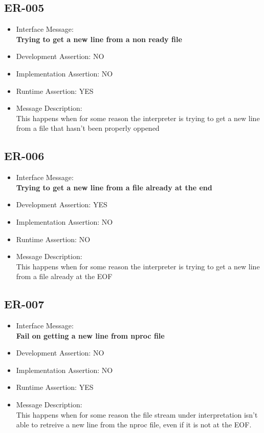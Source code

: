 \subsection{ER-005}
\begin{itemize}
  \item Interface Message:\\[1em]\textbf{Trying to get a new line from a non ready file}
  \item Development Assertion: NO
  \item Implementation Assertion: NO
  \item Runtime Assertion: YES
  \item Message Description:\\[1em]This happens when for some reason the interpreter is trying to get a new line from a file that hasn't been properly oppened
\end{itemize}

\subsection{ER-006}
\begin{itemize}
  \item Interface Message:\\[1em]\textbf{Trying to get a new line from a file already at the end}
  \item Development Assertion: YES
  \item Implementation Assertion: NO
  \item Runtime Assertion: NO
  \item Message Description:\\[1em]This happens when for some reason the interpreter is trying to get a new line from a file already at the EOF
\end{itemize}

\subsection{ER-007}
\begin{itemize}
  \item Interface Message:\\[1em]\textbf{Fail on getting a new line from nproc file}
  \item Development Assertion: NO
  \item Implementation Assertion: NO
  \item Runtime Assertion: YES
  \item Message Description:\\[1em]This happens when for some reason the file stream under interpretation isn't able to retreive a new line from the nproc file, even if it is not at the EOF.
\end{itemize}

